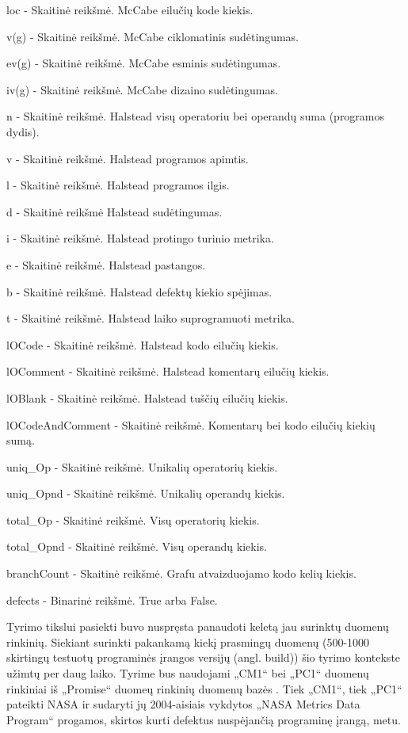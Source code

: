 \documentclass{VUMIFPSbakalaurinis}
\begin{document}
\begin{description} 
\item loc - Skaitinė reikšmė. McCabe eilučių kode kiekis.
\item v(g) - Skaitinė reikšmė. McCabe ciklomatinis sudėtingumas.
\item ev(g) - Skaitinė reikšmė. McCabe esminis sudėtingumas.
\item iv(g) - Skaitinė reikšmė. McCabe dizaino sudėtingumas.
\item n - Skaitinė reikšmė. Halstead visų operatoriu bei operandų suma (programos dydis).
\item v - Skaitinė reikšmė. Halstead programos apimtis.
\item l - Skaitinė reikšmė. Halstead programos ilgis.
\item d - Skaitinė reikšmė Halstead sudėtingumas.
\item i - Skaitinė reikšmė. Halstead protingo turinio metrika.
\item e - Skaitinė reikšmė. Halstead pastangos.
\item b - Skaitinė reikšmė. Halstead defektų kiekio spėjimas.
\item t - Skaitinė reikšmė. Halstead laiko suprogramuoti metrika.
\item lOCode - Skaitinė reikšmė. Halstead kodo eilučių kiekis.
\item lOComment - Skaitinė reikšmė. Halstead komentarų eilučių kiekis.
\item lOBlank - Skaitinė reikšmė. Halstead tuščių eilučių kiekis.
\item lOCodeAndComment - Skaitinė reikšmė. Komentarų bei kodo eilučių kiekių sumą.
\item uniq\_Op - Skaitinė reikšmė. Unikalių operatorių kiekis.
\item uniq\_Opnd - Skaitinė reikšmė. Unikalių operandų kiekis.
\item total\_Op - Skaitinė reikšmė. Visų operatorių kiekis.
\item total\_Opnd - Skaitinė reikšmė. Visų operandų kiekis.
\item branchCount - Skaitinė reikšmė. Grafu atvaizduojamo kodo kelių kiekis.
\item defects - Binarinė reikšmė. True arba False.
\end{description} 

Tyrimo tikslui pasiekti buvo nuspręsta panaudoti keletą jau surinktų duomenų rinkinių. Siekiant surinkti pakankamą kiekį prasmingų duomenų (500-1000 skirtingų testuotų programinės įrangos versijų (angl. build)) šio tyrimo kontekste užimtų per daug laiko. Tyrime bus naudojami  „CM1“ bei „PC1“ duomenų rinkiniai iš  „Promise“ duomeų rinkinių duomenų bazės \cite{Sayyad-Shirabad+Menzies:2005}. Tiek „CM1“, tiek „PC1“ pateikti NASA ir sudaryti jų 2004-aisiais vykdytos „NASA Metrics Data Program“ progamos, skirtos kurti defektus nuspėjančią programinę įrangą, metu.
\end{document}
